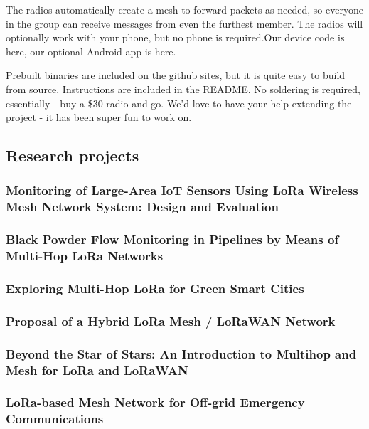					The radios automatically create a mesh to forward packets as needed, so everyone in the group can receive messages from even the furthest member. The radios will optionally work with your phone, but no phone is required.Our device code is here, our optional Android app is here.
					
					Prebuilt binaries are included on the github sites, but it is quite easy to build from source. Instructions are included in the README. No soldering is required, essentially - buy a \$30 radio and go. We'd love to have your help extending the project - it has been super fun to work on.
		
		\subsection{Research projects}
		
			\subsubsection{Monitoring of Large-Area IoT Sensors Using LoRa Wireless Mesh Network System: Design and Evaluation}
			
			\subsubsection{Black Powder Flow Monitoring in Pipelines by Means of Multi-Hop LoRa Networks}
		
			\subsubsection{Exploring Multi-Hop LoRa for Green Smart Cities}
			
			\subsubsection{Proposal of a Hybrid LoRa Mesh / LoRaWAN Network}
			
			\subsubsection{Beyond the Star of Stars: An Introduction to Multihop and Mesh for LoRa and LoRaWAN}
			
			\subsubsection{LoRa-based Mesh Network for Off-grid Emergency Communications}
			
